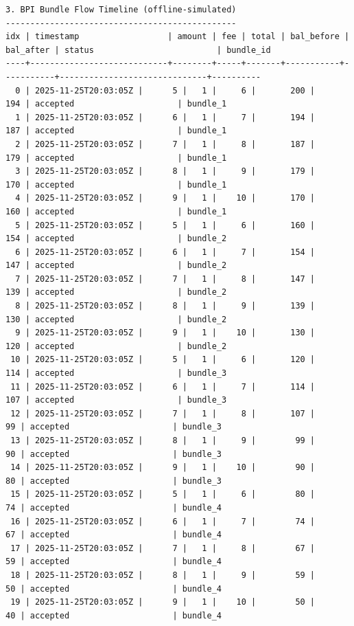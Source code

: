 \begin{lstlisting}[language=text]
3. BPI Bundle Flow Timeline (offline-simulated)
-----------------------------------------------
idx | timestamp                  | amount | fee | total | bal_before | bal_after | status                         | bundle_id
----+----------------------------+--------+-----+-------+-----------+-----------+------------------------------+----------
  0 | 2025-11-25T20:03:05Z |      5 |   1 |     6 |       200 |       194 | accepted                     | bundle_1
  1 | 2025-11-25T20:03:05Z |      6 |   1 |     7 |       194 |       187 | accepted                     | bundle_1
  2 | 2025-11-25T20:03:05Z |      7 |   1 |     8 |       187 |       179 | accepted                     | bundle_1
  3 | 2025-11-25T20:03:05Z |      8 |   1 |     9 |       179 |       170 | accepted                     | bundle_1
  4 | 2025-11-25T20:03:05Z |      9 |   1 |    10 |       170 |       160 | accepted                     | bundle_1
  5 | 2025-11-25T20:03:05Z |      5 |   1 |     6 |       160 |       154 | accepted                     | bundle_2
  6 | 2025-11-25T20:03:05Z |      6 |   1 |     7 |       154 |       147 | accepted                     | bundle_2
  7 | 2025-11-25T20:03:05Z |      7 |   1 |     8 |       147 |       139 | accepted                     | bundle_2
  8 | 2025-11-25T20:03:05Z |      8 |   1 |     9 |       139 |       130 | accepted                     | bundle_2
  9 | 2025-11-25T20:03:05Z |      9 |   1 |    10 |       130 |       120 | accepted                     | bundle_2
 10 | 2025-11-25T20:03:05Z |      5 |   1 |     6 |       120 |       114 | accepted                     | bundle_3
 11 | 2025-11-25T20:03:05Z |      6 |   1 |     7 |       114 |       107 | accepted                     | bundle_3
 12 | 2025-11-25T20:03:05Z |      7 |   1 |     8 |       107 |        99 | accepted                     | bundle_3
 13 | 2025-11-25T20:03:05Z |      8 |   1 |     9 |        99 |        90 | accepted                     | bundle_3
 14 | 2025-11-25T20:03:05Z |      9 |   1 |    10 |        90 |        80 | accepted                     | bundle_3
 15 | 2025-11-25T20:03:05Z |      5 |   1 |     6 |        80 |        74 | accepted                     | bundle_4
 16 | 2025-11-25T20:03:05Z |      6 |   1 |     7 |        74 |        67 | accepted                     | bundle_4
 17 | 2025-11-25T20:03:05Z |      7 |   1 |     8 |        67 |        59 | accepted                     | bundle_4
 18 | 2025-11-25T20:03:05Z |      8 |   1 |     9 |        59 |        50 | accepted                     | bundle_4
 19 | 2025-11-25T20:03:05Z |      9 |   1 |    10 |        50 |        40 | accepted                     | bundle_4


\end{lstlisting}
